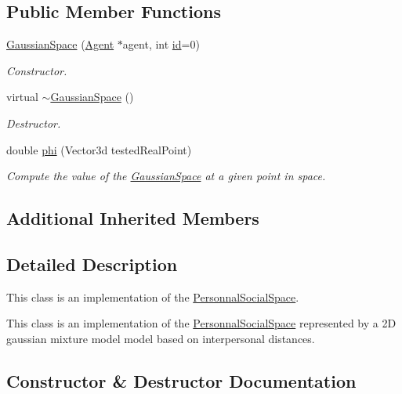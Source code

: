 \subsection*{Public Member Functions}
\begin{DoxyCompactItemize}
\item 
\hyperlink{classGaussianSpace_a04f0be340911fe421b6d226e7be936e1}{Gaussian\+Space} (\hyperlink{classAgent}{Agent} $\ast$agent, int \hyperlink{classIdentifiedObject_ad044a317a9b573a3d1bcd025df166eb5}{id}=0)
\begin{DoxyCompactList}\small\item\em Constructor. \end{DoxyCompactList}\item 
virtual \hyperlink{classGaussianSpace_aff1535add265d12148ba8eca0766e268}{$\sim$\+Gaussian\+Space} ()
\begin{DoxyCompactList}\small\item\em Destructor. \end{DoxyCompactList}\item 
double \hyperlink{classGaussianSpace_a8b1dec9d243861c80d63d3323a36f182}{phi} (Vector3d tested\+Real\+Point)
\begin{DoxyCompactList}\small\item\em Compute the value of the \hyperlink{classGaussianSpace}{Gaussian\+Space} at a given point in space. \end{DoxyCompactList}\end{DoxyCompactItemize}
\subsection*{Additional Inherited Members}


\subsection{Detailed Description}
This class is an implementation of the \hyperlink{classPersonnalSocialSpace}{Personnal\+Social\+Space}. 

This class is an implementation of the \hyperlink{classPersonnalSocialSpace}{Personnal\+Social\+Space} represented by a 2D gaussian mixture model model based on interpersonal distances. 

\subsection{Constructor \& Destructor Documentation}
